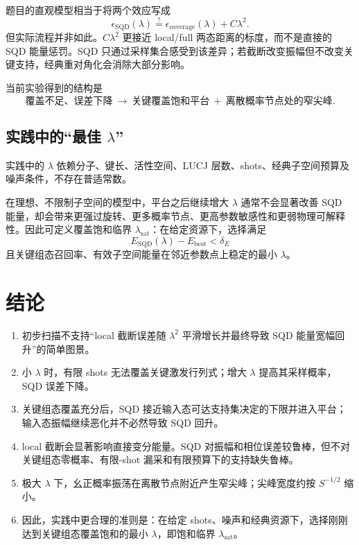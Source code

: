 \documentclass[UTF8,12pt,a4paper]{ctexart}
\begin{document}
题目的直观模型相当于将两个效应写成
\begin{equation}
\epsilon_{\mathrm{SQD}}(\lambda)
\stackrel{?}{=}
\epsilon_{\mathrm{coverage}}(\lambda)+C\lambda^2.
\end{equation}
但实际流程并非如此。$C\lambda^2$ 更接近 local/full 两态距离的标度，而不是直接的 SQD 能量惩罚。SQD 只通过采样集合感受到该差异；若截断改变振幅但不改变关键支持，经典重对角化会消除大部分影响。

当前实验得到的结构是
\begin{equation}
\boxed{
\text{覆盖不足、误差下降}
\ \longrightarrow\ 
\text{关键覆盖饱和平台}
\ +\ 
\text{离散概率节点处的窄尖峰}
}.
\end{equation}

\subsection{\texorpdfstring{实践中的“最佳 $\lambda$”}{实践中的“最佳 lambda”}}

实践中的 $\lambda$ 依赖分子、键长、活性空间、LUCJ 层数、shots、经典子空间预算及噪声条件，不存在普适常数。

在理想、不限制子空间的模型中，平台之后继续增大 $\lambda$ 通常不会显著改善 SQD 能量，却会带来更强过旋转、更多概率节点、更高参数敏感性和更弱物理可解释性。因此可定义覆盖饱和临界 $\lambda_{\mathrm{sat}}$：在给定资源下，选择满足
\begin{equation}
E_{\mathrm{SQD}}(\lambda)-E_{\mathrm{best}}<\delta_E
\end{equation}
且关键组态召回率、有效子空间能量在邻近参数点上稳定的最小 $\lambda$。

\section{结论}

\begin{enumerate}
  \item 初步扫描不支持“local 截断误差随 $\lambda^2$ 平滑增长并最终导致 SQD 能量宽幅回升”的简单图景。
  \item 小 $\lambda$ 时，有限 shots 无法覆盖关键激发行列式；增大 $\lambda$ 提高其采样概率，SQD 误差下降。
  \item 关键组态覆盖充分后，SQD 接近输入态可达支持集决定的下限并进入平台；输入态振幅继续恶化并不必然导致 SQD 回升。
  \item local 截断会显著影响直接变分能量。SQD 对振幅和相位误差较鲁棒，但不对关键组态零概率、有限-shot 漏采和有限预算下的支持缺失鲁棒。
  \item 极大 $\lambda$ 下，幺正概率振荡在离散节点附近产生窄尖峰；尖峰宽度约按 $S^{-1/2}$ 缩小。
  \item 因此，实践中更合理的准则是：在给定 shots、噪声和经典资源下，选择刚刚达到关键组态覆盖饱和的最小 $\lambda$，即饱和临界 $\lambda_{\mathrm{sat}}$。
\end{enumerate}
\end{document}
